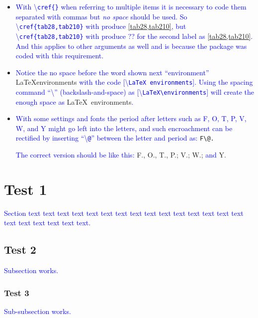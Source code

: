 \documentclass[phd]{ndsu-thesis-2022}
\newcommand\italk[1]{\textcolor{blue}{#1}}  %
\newcommand\cmd[1]{\textbackslash\texttt{#1}}  %
\begin{document}
\begin{itemize}
\item
\italk{With \cmd{cref\{\}} when referring to multiple items it is necessary to code them separated with commas but \emph{no space} should be used. So \cmd{cref\{tab28,tab210\}} with produce} \cref{tab28,tab210}\italk{, but \cmd{cref\{tab28,tab210\}} with produce ?? for the second label as } \cref{tab28,tab210}\italk{. And this applies to other arguments as well and is because the package was coded with this requirement.}

\item
\italk{Notice the no space before the word shown next ``environment''}  \LaTeX environments \italk{with the code [\cmd{LaTeX environments}]. Using the spacing command ``\cmd{\:}'' (backslash-and-space) as [\cmd{LaTeX\textbackslash\:environments}] will create the enough space as} \LaTeX\ environments\italk{.}

\item
\italk{With some settings and fonts the period after letters such as F, O, T, P, V, W, and Y might go left into the letters, and such encroachment can be rectified by inserting ``\cmd{@}'' between the letter and period as:} {\LARGE{\verb|F\@.|}} 

\italk{The correct version should be like this:} {\LARGE F\@., O\@., T\@., P\@.; V\@.; W\@.;} \italk{and} {\LARGE Y\@.}


\end{itemize}


\section{Test 1}
\italk{Section text text text text text text text text text text text text text text text text text text text text text.}

\subsection{Test 2}
\italk{Subsection works.}

\subsubsection{Test 3}
\italk{Sub-subsection works.} 
\kant[3]
\end{document}
